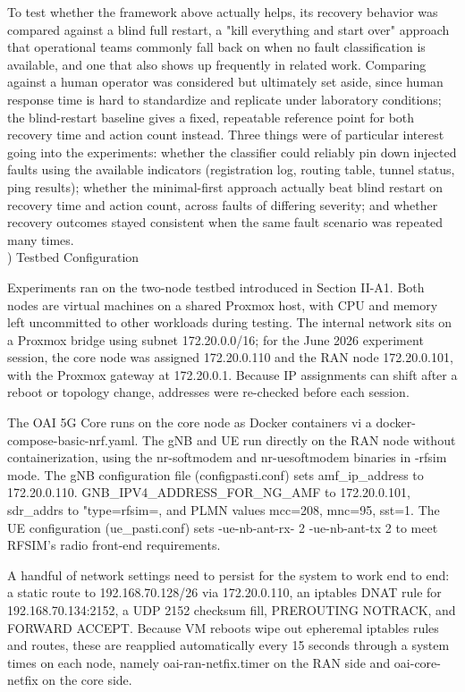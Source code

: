\documentclass[conference]{IEEEtran}
\begin{document}
To test whether the framework above actually helps, its recovery behavior was compared against a blind full restart, a "kill everything and start over" approach that operational teams commonly fall back on when no fault classification is available, and one that also shows up frequently in related work. Comparing against a human operator was considered but ultimately set aside, since human response time is hard to standardize and replicate under laboratory conditions; the blind-restart baseline gives a fixed, repeatable reference point for both recovery time and action count instead. Three things were of particular interest going into the experiments: whether the classifier could reliably pin down injected faults using the available indicators (registration log, routing table, tunnel status, ping results); whether the minimal-first approach actually beat blind restart on recovery time and action count, across faults of differing severity; and whether recovery outcomes stayed consistent when the same fault scenario was repeated many times.\\

) Testbed Configuration

Experiments ran on the two-node testbed introduced in Section II-A1. Both nodes are virtual machines on a shared Proxmox host, with CPU and memory left uncommitted to other workloads during testing. The internal network sits on a Proxmox bridge using subnet 172.20.0.0/16; for the June 2026 experiment session, the core node was assigned 172.20.0.110 and the RAN node 172.20.0.101, with the Proxmox gateway at 172.20.0.1. Because IP assignments can shift after a reboot or topology change, addresses were re-checked before each session.

The OAI 5G Core runs on the core node as Docker containers vi   a docker-compose-basic-nrf.yaml. The gNB and UE run directly on the RAN node without containerization, using the nr-softmodem and nr-uesoftmodem binaries in -rfsim mode. The gNB configuration file (configpasti.conf) sets amf\_ip\_address to 172.20.0.110. GNB\_IPV4\_ADDRESS\_FOR\_NG\_AMF to 172.20.0.101, sdr\_addrs to "type=rfsim=, and PLMN values mcc=208, mnc=95, sst=1. The UE configuration (ue\_pasti.conf) sets -ue-nb-ant-rx- 2 -ue-nb-ant-tx 2 to meet RFSIM's radio front-end requirements.

A handful of network settings need to persist for the system to work end to end: a static route to 192.168.70.128/26 via 172.20.0.110, an iptables DNAT rule for 192.168.70.134:2152, a UDP 2152 checksum fill, PREROUTING NOTRACK, and FORWARD ACCEPT. Because VM reboots wipe out epheremal iptables rules and routes, these are reapplied automatically every 15 seconds through a system times on each node, namely oai-ran-netfix.timer on the RAN side and oai-core-netfix on the core side.
\end{document}
